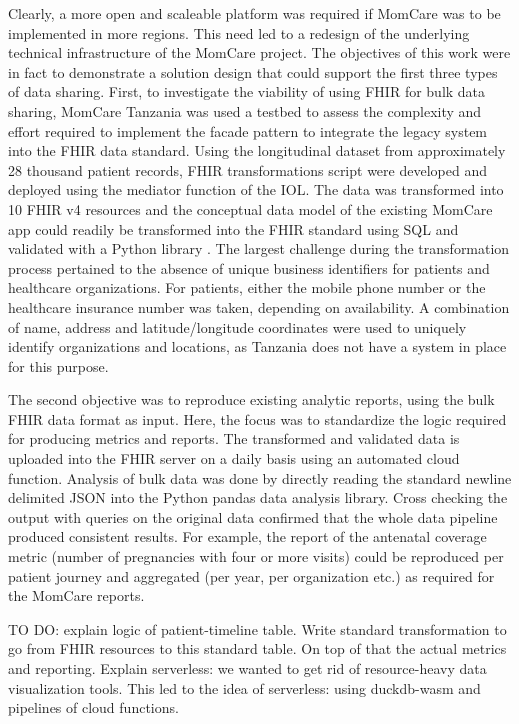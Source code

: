 \documentclass[
  authoryear]{elsarticle}
\begin{document}
Clearly, a more open and scaleable platform was required if MomCare was
to be implemented in more regions. This need led to a redesign of the
underlying technical infrastructure of the MomCare project. The
objectives of this work were in fact to demonstrate a solution design
that could support the first three types of data sharing. First, to
investigate the viability of using FHIR for bulk data sharing, MomCare
Tanzania was used a testbed to assess the complexity and effort required
to implement the facade pattern to integrate the legacy system into the
FHIR data standard. Using the longitudinal dataset from approximately 28
thousand patient records, FHIR transformations script were developed and
deployed using the mediator function of the IOL. The data was
transformed into 10 FHIR v4 resources and the conceptual data model of
the existing MomCare app could readily be transformed into the FHIR
standard using SQL and validated with a Python library
\citep{islam2023fhir}. The largest challenge during the transformation
process pertained to the absence of unique business identifiers for
patients and healthcare organizations. For patients, either the mobile
phone number or the healthcare insurance number was taken, depending on
availability. A combination of name, address and latitude/longitude
coordinates were used to uniquely identify organizations and locations,
as Tanzania does not have a system in place for this purpose.

The second objective was to reproduce existing analytic reports, using
the bulk FHIR data format as input. Here, the focus was to standardize
the logic required for producing metrics and reports. The transformed
and validated data is uploaded into the FHIR server on a daily basis
using an automated cloud function. Analysis of bulk data was done by
directly reading the standard newline delimited JSON into the Python
pandas data analysis library. Cross checking the output with queries on
the original data confirmed that the whole data pipeline produced
consistent results. For example, the report of the antenatal coverage
metric (number of pregnancies with four or more visits) could be
reproduced per patient journey and aggregated (per year, per
organization etc.) as required for the MomCare reports.

TO DO: explain logic of patient-timeline table. Write standard
transformation to go from FHIR resources to this standard table. On top
of that the actual metrics and reporting. Explain serverless: we wanted
to get rid of resource-heavy data visualization tools. This led to the
idea of serverless: using duckdb-wasm and pipelines of cloud functions.
\end{document}
